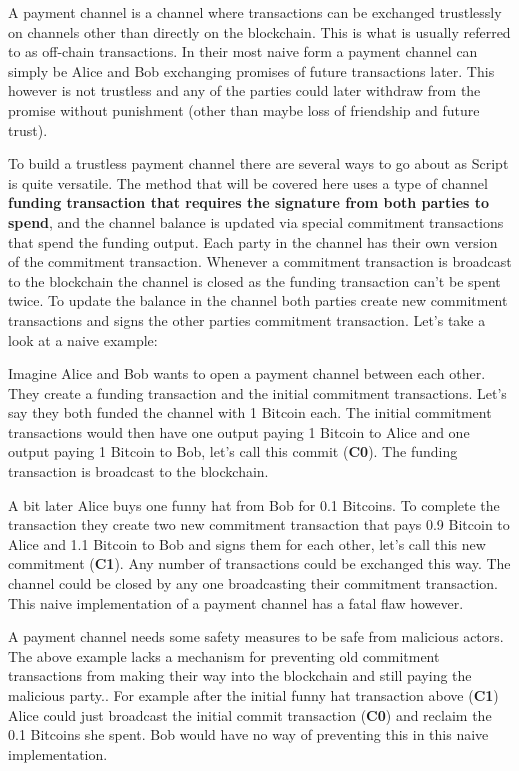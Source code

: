 
A payment channel is a channel where transactions can be exchanged trustlessly on channels other than directly on the blockchain.
This is what is usually referred to as off-chain transactions.
In their most naive form a payment channel can simply be Alice and Bob exchanging promises of future transactions later.
This however is not trustless and any of the parties could later withdraw from the promise without punishment (other than maybe loss of friendship and future trust).

To build a trustless payment channel there are several ways to go about as Script is quite versatile.
The method that will be covered here uses a type of channel \textbf{funding transaction that requires the signature from both parties to spend}, and the channel balance is updated via special commitment transactions that spend the funding output. Each party in the channel has their own version of the commitment transaction. Whenever a commitment transaction is broadcast to the blockchain the channel is closed as the funding transaction can't be spent twice. To update the balance in the channel both parties create new commitment transactions and signs the other parties commitment transaction.\cite{lightningnetwork_2019}\cite{antonopoulos_2017}
Let's take a look at a naive example:

Imagine Alice and Bob wants to open a payment channel between each other. They create a funding transaction and the initial commitment transactions. Let's say they both funded the channel with 1 Bitcoin each. The initial commitment transactions would then have one output paying 1 Bitcoin to Alice and one output paying 1 Bitcoin to Bob, let's call this commit (\textbf{C0}).
The funding transaction is broadcast to the blockchain.

A bit later Alice buys one funny hat from Bob for 0.1 Bitcoins. To complete the transaction they create two new commitment transaction that pays 0.9 Bitcoin to Alice and 1.1 Bitcoin to Bob and signs them for each other, let's call this new commitment (\textbf{C1}). Any number of transactions could be exchanged this way. The channel could be closed by any one broadcasting their commitment transaction. This naive implementation of a payment channel has a fatal flaw however. 

A payment channel needs some safety measures to be safe from malicious actors. The above example lacks a mechanism for preventing old commitment transactions from making their way into the blockchain and still paying the malicious party.. For example after the initial funny hat transaction above (\textbf{C1}) Alice could just broadcast the initial commit transaction (\textbf{C0}) and reclaim the 0.1 Bitcoins she spent. Bob would have no way of preventing this in this naive implementation.

